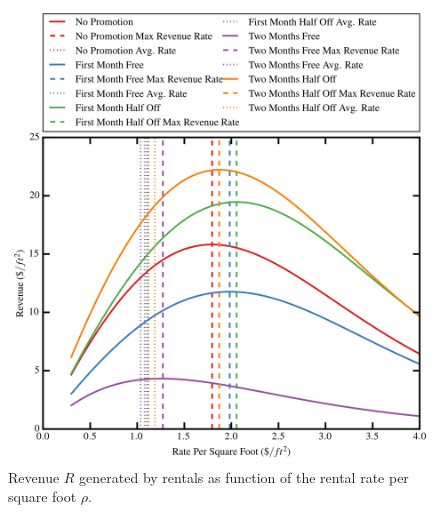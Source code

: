 \documentclass[times]{aastex6}
\begin{document}
\begin{figure}
	\includegraphics[width=0.9\columnwidth]{plots/RevenueCurve.jpg}
    \caption{Revenue $R$ generated by rentals as function of the rental rate per square foot $\rho$.}
    \label{fig:RevenueCurve}
\end{figure}
\end{document}
